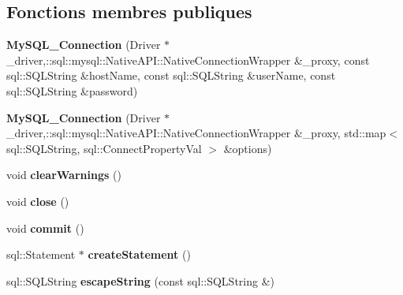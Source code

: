 \subsection*{Fonctions membres publiques}
\begin{DoxyCompactItemize}
\item 
{\bfseries My\+S\+Q\+L\+\_\+\+Connection} (Driver $\ast$\+\_\+driver,\+::sql\+::mysql\+::\+Native\+A\+P\+I\+::\+Native\+Connection\+Wrapper \&\+\_\+proxy, const sql\+::\+S\+Q\+L\+String \&host\+Name, const sql\+::\+S\+Q\+L\+String \&user\+Name, const sql\+::\+S\+Q\+L\+String \&password)\hypertarget{classsql_1_1mysql_1_1MySQL__Connection_ac416ee488b73f8d76e3a06388221a129}{}\label{classsql_1_1mysql_1_1MySQL__Connection_ac416ee488b73f8d76e3a06388221a129}

\item 
{\bfseries My\+S\+Q\+L\+\_\+\+Connection} (Driver $\ast$\+\_\+driver,\+::sql\+::mysql\+::\+Native\+A\+P\+I\+::\+Native\+Connection\+Wrapper \&\+\_\+proxy, std\+::map$<$ sql\+::\+S\+Q\+L\+String, sql\+::\+Connect\+Property\+Val $>$ \&options)\hypertarget{classsql_1_1mysql_1_1MySQL__Connection_a4365bfd56d803258f9ed47d95eafaf56}{}\label{classsql_1_1mysql_1_1MySQL__Connection_a4365bfd56d803258f9ed47d95eafaf56}

\item 
void {\bfseries clear\+Warnings} ()\hypertarget{classsql_1_1mysql_1_1MySQL__Connection_aa792ed9b722ec4b45842872865fcc1d9}{}\label{classsql_1_1mysql_1_1MySQL__Connection_aa792ed9b722ec4b45842872865fcc1d9}

\item 
void {\bfseries close} ()\hypertarget{classsql_1_1mysql_1_1MySQL__Connection_aa8d0be382f89bfe031d276a2c67bb7fb}{}\label{classsql_1_1mysql_1_1MySQL__Connection_aa8d0be382f89bfe031d276a2c67bb7fb}

\item 
void {\bfseries commit} ()\hypertarget{classsql_1_1mysql_1_1MySQL__Connection_aca3dab58cd10c2bd877fadc2fa7b9b3f}{}\label{classsql_1_1mysql_1_1MySQL__Connection_aca3dab58cd10c2bd877fadc2fa7b9b3f}

\item 
sql\+::\+Statement $\ast$ {\bfseries create\+Statement} ()\hypertarget{classsql_1_1mysql_1_1MySQL__Connection_a65dd9ce62b91f6ee7422bf6acaa6dc59}{}\label{classsql_1_1mysql_1_1MySQL__Connection_a65dd9ce62b91f6ee7422bf6acaa6dc59}

\item 
sql\+::\+S\+Q\+L\+String {\bfseries escape\+String} (const sql\+::\+S\+Q\+L\+String \&)\hypertarget{classsql_1_1mysql_1_1MySQL__Connection_a4ab19794fc96f0b771dc7f3a9b89d445}{}\label{classsql_1_1mysql_1_1MySQL__Connection_a4ab19794fc96f0b771dc7f3a9b89d445}


\end{DoxyCompactItemize}
